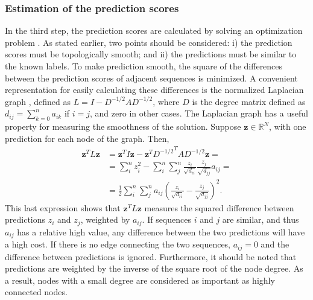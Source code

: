 \documentclass{article}
\begin{document}
\subsubsection{Estimation of the prediction scores}
In the third step, the prediction scores are calculated by solving an optimization problem \citep{joachims2003transductive}. As stated earlier, two points should be considered: i) the prediction scores must be topologically smooth; and ii) the predictions must be similar to the known labels. To make prediction smooth, the square of the differences between the prediction scores of adjacent sequences is minimized. A convenient representation for easily calculating these differences is the normalized Laplacian graph \citep{shi2000normalized}, defined as $L = I- D^{-1/2} A D^{-1/2}$, where $D$ is the degree matrix defined as $d_{ij} = \sum_{k=0}^n a_{ik}$ if $i=j$, and zero in other cases. The Laplacian graph has a useful property for measuring the smoothness of the solution. Suppose $\mathbf{z} \in \mathbb{R}^N$, with one prediction for each node of the graph. Then,
\begin{equation}
	\begin{split}
		\mathbf{z}^T L \mathbf{z} & = \mathbf{z}^T I \mathbf{z} - \mathbf{z}^T {D^{-1/2}}^T A D^{-1/2} \mathbf{z} = \\
					  & = \sum_{i}^{n} z_{i}^{2} -  \sum_{i}^{n}  \sum_{j}^{n} \frac{z_{i}}{\sqrt{d_{ii}}} \frac{z_{j}}{\sqrt{d_{jj}}} a_{ij} = \\
					  & = \frac{1}{2} \sum_{i}^{n} \sum_{j}^{n} a_{ij} \left(\frac{z_{i}}{ \sqrt{d_{ii}}} - \frac{z_{j}}{\sqrt{d_{jj}}} \right)^{2}.
	\end{split}
\end{equation}
\noindent This last expression shows that $\mathbf{z}^T L \mathbf{z}$ measures the squared difference between predictions $z_{i}$ and $z_{j}$, weighted by $a_{ij}$. If sequences $i$ and $j$ are similar, and thus $a_{ij}$ has a relative high value, any difference between the two predictions will have a high cost. If there is no edge connecting the two sequences, $a_{ij}=0$ and the difference between predictions is ignored. Furthermore, it should be noted that predictions are weighted by the inverse of the square root of the node degree. As a result, nodes with a small degree are considered as important as highly connected nodes.
\end{document}
